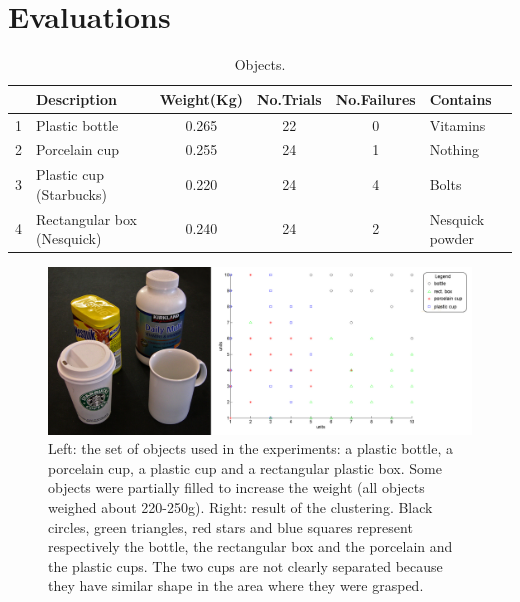 \section{Evaluations}
\label{sec:results}

\begin{table}[htb]
  \caption{Objects.} \label{tab:objects} \centering
  \begin{tabular}{|c|l|c|c|c|l|}
    \hline
    &Description& Weight(Kg)&No.Trials&No.Failures&Contains \\
    \hline
    1&Plastic bottle        & 0.265 & 22& 0 & Vitamins\\
    2&Porcelain cup & 0.255 & 24& 1 & Nothing\\
    3&Plastic cup (Starbucks)      & 0.220 & 24& 4 & Bolts \\
    4&Rectangular box (Nesquick)        & 0.240 & 24& 2 & Nesquick powder\\

    \hline
  \end{tabular}
\end{table}

\begin{figure}[tbp]
\centerline{
\includegraphics[width=6.0in]{./figures/objects-clusters2.eps}
}\caption[Objects grabbed and clustering]{Left: the set of objects
used in the experiments: a plastic bottle, a porcelain cup, a
plastic cup and a rectangular plastic box. Some objects were
partially filled to increase the weight (all objects weighed about
220-250g). Right: result of the clustering. Black circles, green
triangles, red stars and blue squares represent respectively the
bottle, the rectangular box and the porcelain and the plastic
cups. The two cups are not clearly separated because they have
similar shape in the area where they were grasped.}
\label{fig:Objects}
\end{figure}


